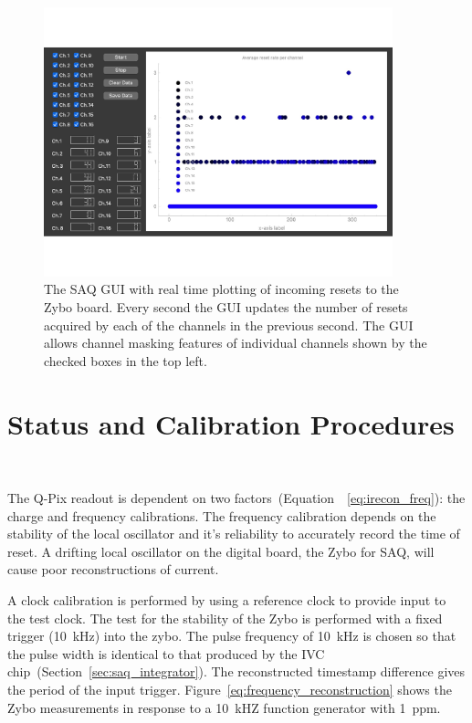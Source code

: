 \begin{figure}[]
\centering
\includegraphics[width=0.9\textwidth]{images/SAQ_gui_resets.pdf}
\caption{The SAQ GUI with real time plotting of incoming resets to the Zybo board.
Every second the GUI updates the number of resets acquired by each of the channels in the previous second.
The GUI allows channel masking features of individual channels shown by the checked boxes in the top left.
}
\label{fig:saq_gui}
\end{figure}


\section{Status and Calibration Procedures}~\label{sec:saq_calib}

The Q-Pix readout is dependent on two factors~(Equation~~\ref{eq:irecon_freq}): the charge and frequency calibrations.
The frequency calibration depends on the stability of the local oscillator and it's reliability to accurately record the time of reset.
A drifting local oscillator on the digital board, the Zybo for SAQ, will cause poor reconstructions of current.

A clock calibration is performed by using a reference clock to provide input to the test clock.
The test for the stability of the Zybo is performed with a fixed trigger (10~\unit{kHz}) into the zybo.
The pulse frequency of 10~\unit{kHz} is chosen so that the pulse width is identical to that produced by the IVC chip~(Section~\ref{sec:saq_integrator}).
The reconstructed timestamp difference gives the period of the input trigger.
Figure~\ref{eq:frequency_reconstruction} shows the Zybo measurements in response to a 10~\unit{kHZ} function generator with 1~\unit{ppm}.

